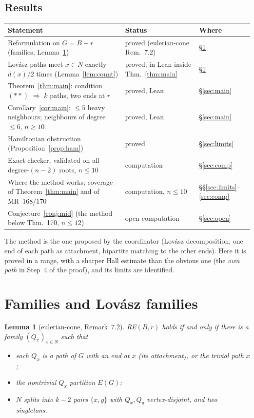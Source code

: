 \documentclass[11pt]{amsart}
\newtheorem{lemma}[theorem]{Lemma}
\theoremstyle{definition}
\begin{document}
\subsection*{Results}
\begin{center}\small
\begin{tabular}{@{}>{\raggedright}p{}>{\raggedright}p{}p{}@{}}
\toprule
Statement & Status & Where\\
\midrule
Reformulation on $G=B-r$ (families, Lemma~\ref{lem:fam}) & proved (eulerian-cone Rem.~7.2) & \S\ref{sec:fam}\\
Lov\'asz paths meet $x\in N$ exactly $d(x)/2$ times (Lemma~\ref{lem:count}) & proved; in Lean inside Thm.~\ref{thm:main} & \S\ref{sec:fam}\\
Theorem~\ref{thm:main}: condition $(\ast\ast)$ $\Rightarrow$ $k$ paths, two ends at $r$ & proved, Lean & \S\ref{sec:main}\\
Corollary~\ref{cor:main}: $\le5$ heavy neighbours; neighbours of degree $\le 6$, $n\ge10$ & proved, Lean & \S\ref{sec:main}\\
Hamiltonian obstruction (Proposition~\ref{prop:ham}) & proved & \S\ref{sec:limits}\\
Exact checker, validated on all degree-$(n-2)$ roots, $n\le10$ & computation & \S\ref{sec:comp}\\
Where the method works; coverage of Theorem~\ref{thm:main} and of MR~168/170 & computation, $n\le10$ & \S\S\ref{sec:limits}--\ref{sec:comp}\\
Conjecture~\ref{conj:mid} (the method below Thm.~170, $n\le12$) & open computation & \S\ref{sec:open}\\
\bottomrule
\end{tabular}
\end{center}

The method is the one proposed by the coordinator (Lov\'asz decomposition, one end of each path as
attachment, bipartite matching to the other ends). Here it is proved in a range, with a sharper
Hall estimate than the obvious one (the \emph{own path} in Step~4 of the proof), and its limits are
identified.

\section{Families and Lov\'asz families}\label{sec:fam}

\begin{lemma}[eulerian-cone, Remark~7.2]\label{lem:fam}
RE$(B,r)$ holds if and only if there is a family $(Q_x)_{x\in N}$ such that
\begin{itemize}[leftmargin=*]
\item each $Q_x$ is a path of $G$ with an end at $x$ (its \emph{attachment}), or the trivial path $x$;
\item the nontrivial $Q_x$ partition $E(G)$;
\item $N$ splits into $k-2$ pairs $\{x,y\}$ with $Q_x,Q_y$ vertex-disjoint, and two singletons.
\end{itemize}
\end{lemma}
\end{document}
